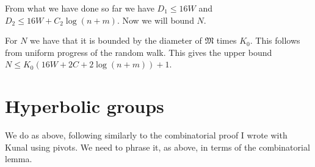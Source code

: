 From what we have done so far we have $D_1\le 16 W$ and $D_2\le 16W +C_2\log(n+m)$. Now we will bound $N$.

For $N$ we have that it is bounded by the diameter of $\mathfrak{M}$ times $K_0$. This follows from uniform progress of the random walk. This gives the upper bound $N\le K_0 (16W+2C+2\log(n+m))+1$.


\section{Hyperbolic groups}

We do as above, following similarly to the combinatorial proof I wrote with Kunal using pivots. We need to phrase it, as above, in terms of the combinatorial lemma.